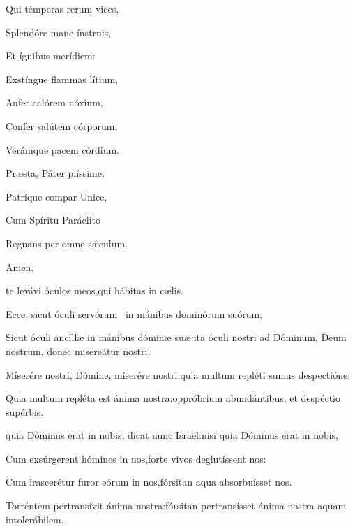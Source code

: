 \begin{multicols}{2}
\Hymne{}

Qui témperas rerum vices,

Splendóre mane ínstruis,

Et ígnibus merídiem\thinspace:

\vspace{0.3cm}

Exstíngue flammas lítium,

Aufer calórem nóxium,

Confer salútem córporum,

Verámque pacem córdium.

\vspace{0.3cm}

Præsta, Páter piíssime,

Patríque compar Unice,

Cum Spíritu Paráclito

Regnans per omne sǽculum.

\begin{flushright}
Amen.
\end{flushright}




\Normal

 te levávi óculos meos,\GreStarNbsp qui hábitas in cælis.

Ecce, sicut óculi servórum \GreStar\ in mánibus dominórum suórum,

Sicut óculi ancíllæ in mánibus dóminæ suæ\thinspace:\GreStarNbsp ita óculi nostri ad Dóminum, Deum nostrum, donec misereátur nostri.

Miserére nostri, Dómine, miserére nostri\thinspace:\GreStarNbsp quia multum repléti sumus despectióne\thinspace:

Quia multum repléta est ánima nostra\thinspace:\GreStarNbsp oppróbrium abundántibus, et despéctio supérbis.



\Normal

 quia Dóminus erat in nobis, dicat nunc Israël\thinspace:\GreStarNbsp nisi quia Dóminus erat in nobis,

Cum exsúrgerent hómines in nos,\GreStarNbsp forte vivos deglutíssent nos\thinspace:

Cum irascerétur furor eórum in nos,\GreStarNbsp fórsitan aqua absorbuísset nos.

Torréntem pertransívit ánima nostra\thinspace:\GreStarNbsp fórsitan pertransísset ánima nostra aquam intolerábilem.


\end{multicols}
